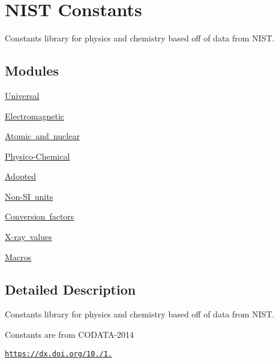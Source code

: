 \hypertarget{group___n_i_s_t_const}{}\section{N\+I\+ST Constants}
\label{group___n_i_s_t_const}


Constants library for physics and chemistry based off of data from N\+I\+ST.  


\subsection*{Modules}
\begin{DoxyCompactItemize}
\item 
\mbox{\hyperlink{group___n_i_s_t_const-_universal}{Universal}}
\item 
\mbox{\hyperlink{group___n_i_s_t_const-_electromagnetic}{Electromagnetic}}
\item 
\mbox{\hyperlink{group___n_i_s_t_const-_atomic}{Atomic and nuclear}}
\item 
\mbox{\hyperlink{group___n_i_s_t_const-_physico_chemical}{Physico-\/\+Chemical}}
\item 
\mbox{\hyperlink{group___n_i_s_t_const-_adopted}{Adopted}}
\item 
\mbox{\hyperlink{group___n_i_s_t_const-_non-_s_i}{Non-\/\+S\+I units}}
\item 
\mbox{\hyperlink{group___n_i_s_t_const-_conversion_factors}{Conversion factors}}
\item 
\mbox{\hyperlink{group___n_i_s_t_const-_x-ray}{X-\/ray values}}
\item 
\mbox{\hyperlink{group___n_i_s_t_const-_macros}{Macros}}
\end{DoxyCompactItemize}


\subsection{Detailed Description}
Constants library for physics and chemistry based off of data from N\+I\+ST. 

Constants are from C\+O\+D\+A\+T\+A-\/2014

\href{https://dx.doi.org/10.1063/1.4954402}{\tt https\+://dx.\+doi.\+org/10./1.} 